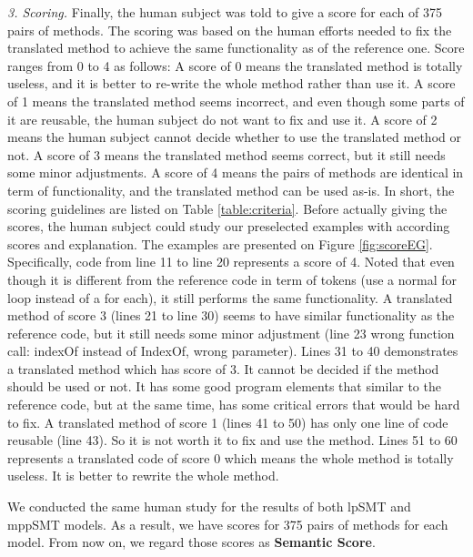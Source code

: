 \emph{3. Scoring.} Finally, the human subject was told to give a score for each of 375 pairs of methods. The scoring was based on the human efforts needed to fix the translated method to achieve the same functionality as of the reference one. Score ranges from 0 to 4 as follows: A score of 0 means the translated method is totally useless, and it is better to re-write the whole method rather than use it. A score of 1 means the translated method seems incorrect, and even though some parts of it are reusable, the human subject do not want to fix and use it. A score of 2 means the human subject cannot decide whether to use the translated method or not. A score of 3 means the translated method seems correct, but it still needs some minor adjustments. A score of 4 means the pairs of methods are identical in term of functionality, and the translated method can be used as-is. In short, the scoring guidelines are listed on Table \ref{table:criteria}. Before actually giving the scores, the human subject could study our preselected examples with according scores and explanation. The examples are presented on Figure \ref{fig:scoreEG}. Specifically, code from line 11 to line 20 represents a score of 4. Noted that even though it is different from the reference code in term of tokens (use a normal for loop instead of a for each), it still performs the same functionality. A translated method of score 3 (lines 21 to line 30) seems to have similar functionality as the reference code, but it still needs some minor adjustment (line 23 wrong function call: indexOf instead of IndexOf, wrong parameter). Lines 31 to 40 demonstrates a translated method which has score of 3. It cannot be decided if the method should be used or not. It has some good program elements that similar to the reference code, but at the same time, has some critical errors that would be hard to fix. A translated method of score 1 (lines 41 to 50) has only one line of code reusable (line 43). So it is not worth it to fix and use the method. Lines 51 to 60 represents a translated code of score 0 which means the whole method is totally useless. It is better to rewrite the whole method. 

We conducted the same human study for the results of both lpSMT and mppSMT models. As a result, we have scores for 375 pairs of methods for each model. From now on, we regard those scores as \textbf{Semantic Score}.

